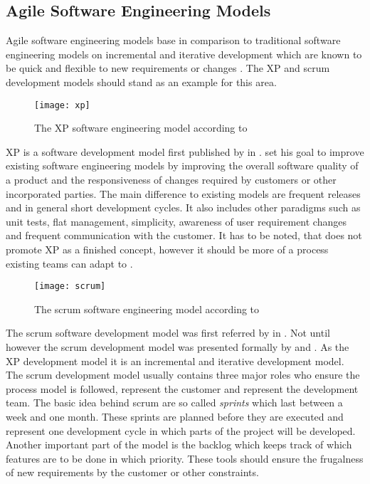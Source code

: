 
\subsection{Agile Software Engineering Models} %

Agile software engineering models base in comparison to traditional software
engineering models on incremental and iterative development which are known to
be quick and flexible to new requirements or changes \cite{Beck1999}. The
\ac{XP} and scrum development models should stand as an example for this area.

\begin{figure}[htbp]
  \centering
  \texttt{[image: xp]}
  \caption{The \ac{XP} software engineering model according to \textcite{Beck1999a}}
\end{figure}

\ac{XP} is a software development model first published by
\citeauthor{Beck1999} \cite{Beck1999a} in \citeyear{Beck1999}.
\citeauthor{Beck1999} set his goal to improve existing software engineering
models by improving the overall software quality of a product and the
responsiveness of changes required by customers or other incorporated parties.
The main difference to existing models are frequent releases and in general
short development cycles. It also includes other paradigms such as unit tests,
flat management, simplicity, awareness of user requirement changes and frequent
communication with the customer. It has to be noted, that \citeauthor{Beck1999}
does not promote \ac{XP} as a finished concept, however it should be more of a
process existing teams can adapt to \cite{Beck1999}.

\begin{figure}[htbp]
  \centering
  \texttt{[image: scrum]}
  \caption{The scrum software engineering model according to \textcite{Schwaber1995}}
\end{figure}

The scrum software development model was first referred by
\textcite{DeGrace1990} in \citeyear{DeGrace1990}. Not until
\citeyear{Sutherland1995} however the scrum development model was presented
formally by \textcite{Sutherland1995} and \textcite{Schwaber1995}. As the
\ac{XP} development model it is an incremental and iterative development model.
The scrum development model usually contains three major roles who ensure the
process model is followed, represent the customer and represent the development
team. The basic idea behind scrum are so called \emph{sprints} which last
between a week and one month. These sprints are planned before they are
executed and represent one development cycle in which parts of the project will
be developed. Another important part of the model is the backlog which keeps
track of which features are to be done in which priority. These tools should
ensure the frugalness of new requirements by the customer or other constraints.



